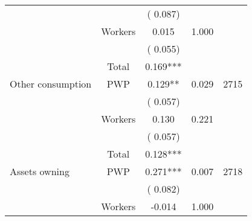 \begin{tabular}{l*{4}{c}}
                               &                               &       (       0.087)                              & &                                                                             \\ 
                               &       Workers         &              0.015                 &        1.000    &                                               \\ 
                               &                               &       (       0.055)                              & &                                                                             \\ 
\cmidrule{2-3}
                               &       Total           &              0.169***                 &    &                                               \\ 
\cmidrule{2-3}
 Other consumption                 &       PWP     &              0.129**                 &        0.029    & 2715                               \\ 
                               &                               &       (       0.057)                              & &                                                                             \\ 
                               &       Workers         &              0.130                 &        0.221    &                                               \\ 
                               &                               &       (       0.057)                              & &                                                                             \\ 
\cmidrule{2-3}
                               &       Total           &              0.128***                 &    &                                               \\ 
\cmidrule{2-3}
 Assets owning                 &       PWP     &              0.271***                 &        0.007    & 2718                               \\ 
                               &                               &       (       0.082)                              & &                                                                             \\ 
                               &       Workers         &             -0.014               &        1.000   &                                               \\ 

\end{tabular}
